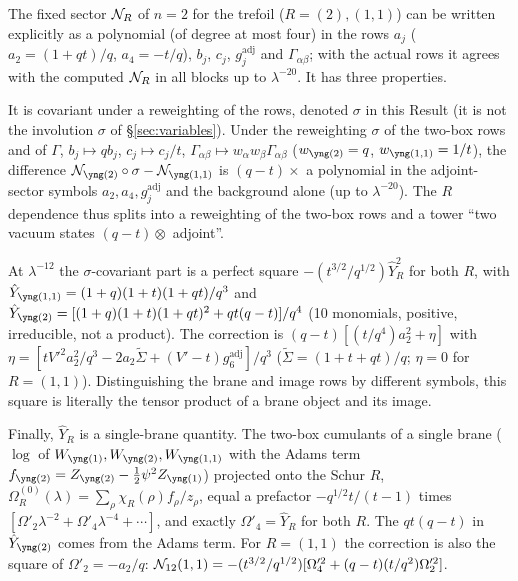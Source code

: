 \begin{result}[rows of $n = 2$ and the $R$ dependence]\label{cr:n2rows}
The fixed sector $\mathcal{N}_R$ of $n = 2$ for the trefoil ($R = (2), (1,1)$) can be written explicitly as a polynomial (of degree at most four) in the rows $a_j$ ($a_2 = (1+qt)/q$, $a_4 = -t/q$), $b_j$, $c_j$, $g^{\mathrm{adj}}_j$ and $\Gamma_{\alpha\beta}$; with the actual rows it agrees with the computed $\mathcal{N}_R$ in all blocks up to $\lambda^{-20}$. It has three properties.

It is covariant under a reweighting of the rows, denoted $\sigma$ in this Result (it is not the involution $\sigma$ of \S\ref{sec:variables}). Under the reweighting $\sigma$ of the two-box rows and of $\Gamma$, $b_j \mapsto qb_j$, $c_j \mapsto c_j/t$, $\Gamma_{\alpha\beta} \mapsto w_\alpha w_\beta \Gamma_{\alpha\beta}$ ($w_{\ytwo} = q$, $w_{\yoneone} = 1/t$), the difference $\Nfix_{\ytwo}\circ\sigma - \Nfix_{\yoneone}$ is $(q-t)\times$ a polynomial in the adjoint-sector symbols $a_2, a_4, g^{\mathrm{adj}}_j$ and the background alone (up to $\lambda^{-20}$). The $R$ dependence thus splits into a reweighting of the two-box rows and a tower ``two vacuum states $(q-t)\otimes$ adjoint''.

At $\lambda^{-12}$ the $\sigma$-covariant part is a perfect square $-(t^{3/2}/q^{1/2})\hat Y_R^2$ for both $R$, with $\hat Y_{\yoneone} = (1+q)(1+t)(1+qt)/q^3$ and $\hat Y_{\ytwo} = [(1+q)(1+t)(1+qt)^2 + qt(q-t)]/q^4$ (10 monomials, positive, irreducible, not a product). The correction is $(q-t)[(t/q^4)a_2^2 + \eta]$ with $\eta = [tV'^2a_2^2/q^3 - 2a_2\tilde\Sigma + (V'-t)g^{\mathrm{adj}}_6]/q^3$ ($\tilde\Sigma = (1+t+qt)/q$; $\eta = 0$ for $R = (1,1)$). Distinguishing the brane and image rows by different symbols, this square is literally the tensor product of a brane object and its image.

Finally, $\hat Y_R$ is a single-brane quantity. The two-box cumulants of a single brane ($\log$ of $W_{\yone}, W_{\ytwo}, W_{\yoneone}$ with the Adams term $f_{\ytwo} = Z_{\ytwo} - \tfrac12\psi^2 Z_{\yone}$) projected onto the Schur $R$, $\Omega^{(0)}_R(\lambda) = \sum_\rho \chi_R(\rho)f_\rho/z_\rho$, equal a prefactor $-q^{1/2}t/(t-1)$ times $[\Omega'_2\lambda^{-2} + \Omega'_4\lambda^{-4} + \cdots]$, and exactly $\Omega'_4 = \hat Y_R$ for both $R$. The $qt(q-t)$ in $\hat Y_{\ytwo}$ comes from the Adams term. For $R = (1,1)$ the correction is also the square of $\Omega'_2 = -a_2/q$: $\mathcal{N}_{12}(1,1) = -(t^{3/2}/q^{1/2})[\Omega_4'^2 + (q-t)(t/q^2)\Omega_2'^2]$.
\end{result}
